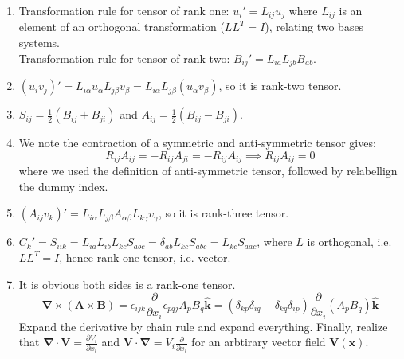 \documentclass[a4paper]{article}
\begin{document}
\begin{ans}\leavevmode
\begin{enumerate}[label=(\roman*)]
\item Transformation rule for tensor of rank one: $u_i'=L_{ij}u_j$ where $L_{ij}$ is an element of an orthogonal transformation ($LL^T=I$), relating two bases systems.\\[5pt]
Transformation rule for tensor of rank two: $B_{ij}'=L_{ia}L_{jb}B_{ab}$.
\item $(u_iv_j)'=L_{i\alpha}u_\alpha L_{j\beta}v_\beta=L_{i\alpha}L_{j\beta}(u_\alpha v_\beta)$, so it is rank-two tensor.
\item $S_{ij}=\frac{1}{2}(B_{ij}+B_{ji})$ and $A_{ij}=\frac{1}{2}(B_{ij}-B_{ji})$.
\item We note the contraction of a symmetric and anti-symmetric tensor gives:
$$R_{ij}A_{ij}=-R_{ij}A_{ji}=-R_{ij}A_{ij}\implies R_{ij}A_{ij}=0$$
where we used the definition of anti-symmetric tensor, followed by relabellign the dummy index.
\item $(A_{ij}v_k)'=L_{i\alpha}L_{j\beta}A_{\alpha\beta}L_{k\gamma}v_\gamma$, so it is rank-three tensor.
\item $C_k'=S_{iik}=L_{ia}L_{ib}L_{kc}S_{abc}=\delta_{ab}L_{kc}S_{abc}=L_{kc}S_{aac}$, where $L$ is orthogonal, i.e. $LL^T=I$, hence rank-one tensor, i.e. vector.
\item It is obvious both sides is a rank-one tensor.
$$\boldsymbol{\nabla}\times(\mathbf{A}\times\mathbf{B})=\epsilon_{ijk}\frac{\partial}{\partial x_i}\epsilon_{pqj}A_pB_q\mathbf{\hat{k}}=(\delta_{kp}\delta_{iq}-\delta_{kq}\delta_{ip})\frac{\partial}{\partial x_i}(A_pB_q)\mathbf{\hat{k}}$$
Expand the derivative by chain rule and expand everything. Finally, realize that $\boldsymbol{\nabla}\cdot\mathbf{V}=\frac{\partial V_i}{\partial x_i}$ and $\mathbf{V}\cdot\boldsymbol{\nabla}=V_i\frac{\partial}{\partial x_i}$ for an arbtirary vector field $\mathbf{V}(\mathbf{x})$.
\end{enumerate}
\end{ans}
\newpage
\end{document}
